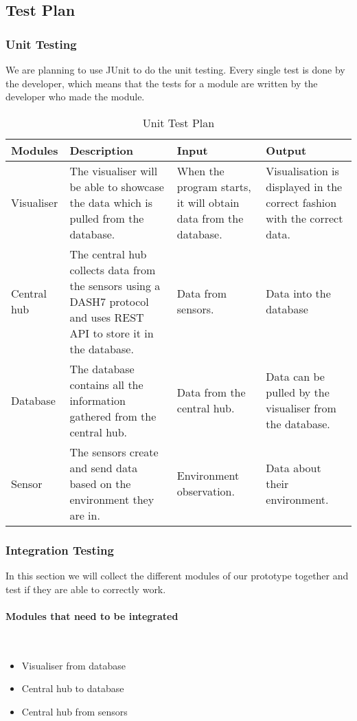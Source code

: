 \documentclass[../document]{subfiles}
\begin{document}
\subsection{Test Plan}
\subsubsection{Unit Testing}
We are planning to use JUnit to do the unit testing. Every single test is done by the developer, which means that the tests for a module are written by the developer who made the module. 

\begin{table}[H]
\caption{Unit Test Plan}
\centering
\begin{tabularx}{\textwidth}{|l|X|X|X|}
	\hline
	Modules
	&Description
	&Input
	&Output
	\\ \hline Visualiser
	&The visualiser will be able to showcase the data which is pulled from the database.
	&When the program starts, it will obtain data from the database.
	&Visualisation is displayed in the correct fashion with the correct data.
	\\ \hline Central hub
	&The central hub collects data from the sensors using a DASH7 protocol and uses REST API to store it in the database.
	&Data from sensors.
	&Data into the database
	\\ \hline Database
	&The database contains all the information gathered from the central hub.
	&Data from the central hub.
	&Data can be pulled by the visualiser from the database.
	\\ \hline Sensor
	&The sensors create and send data based on the environment they are in.
	&Environment observation.
	&Data about their environment.
	\\ \hline 
\end{tabularx}
\end{table}

\subsubsection{Integration Testing}
In this section we will collect the different modules of our prototype together and test if they are able to correctly work.

\paragraph{Modules that need to be integrated} \ \\
\begin{itemize}
	\item
	Visualiser from database
	\item
	Central hub to database
	\item
	Central hub from sensors
\end{itemize}
\end{document}

